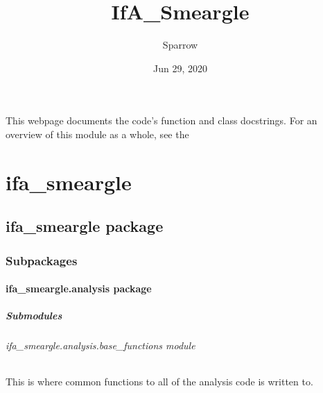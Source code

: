 \documentclass[letterpaper,10pt,english]{sphinxmanual}
\title{IfA\_Smeargle}
\date{Jun 29, 2020}
\author{Sparrow}
\begin{document}
\pagestyle{empty}
\sphinxmaketitle
\pagestyle{plain}
\sphinxtableofcontents
\pagestyle{normal}
\label{\detokenize{index::doc}}


This webpage documents the code’s function and class docstrings.
For an overview of this module as a whole, see the


\chapter{ifa\_smeargle}
\label{\detokenize{docstrings/modules:ifa-smeargle}}\label{\detokenize{docstrings/modules::doc}}

\section{ifa\_smeargle package}
\label{\detokenize{docstrings/ifa_smeargle:ifa-smeargle-package}}\label{\detokenize{docstrings/ifa_smeargle::doc}}

\subsection{Subpackages}
\label{\detokenize{docstrings/ifa_smeargle:subpackages}}

\subsubsection{ifa\_smeargle.analysis package}
\label{\detokenize{docstrings/ifa_smeargle.analysis:ifa-smeargle-analysis-package}}\label{\detokenize{docstrings/ifa_smeargle.analysis::doc}}

\paragraph{Submodules}
\label{\detokenize{docstrings/ifa_smeargle.analysis:submodules}}

\subparagraph{ifa\_smeargle.analysis.base\_functions module}
\label{\detokenize{docstrings/ifa_smeargle.analysis.base_functions:module-ifa_smeargle.analysis.base_functions}}\label{\detokenize{docstrings/ifa_smeargle.analysis.base_functions:ifa-smeargle-analysis-base-functions-module}}\label{\detokenize{docstrings/ifa_smeargle.analysis.base_functions::doc}}
This is where common functions to all of the analysis
code is written to.
\end{document}

